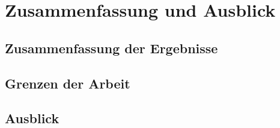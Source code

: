 \chapter{Zusammenfassung und Ausblick}

\section{Zusammenfassung der Ergebnisse}

\section{Grenzen der Arbeit}

\section{Ausblick}